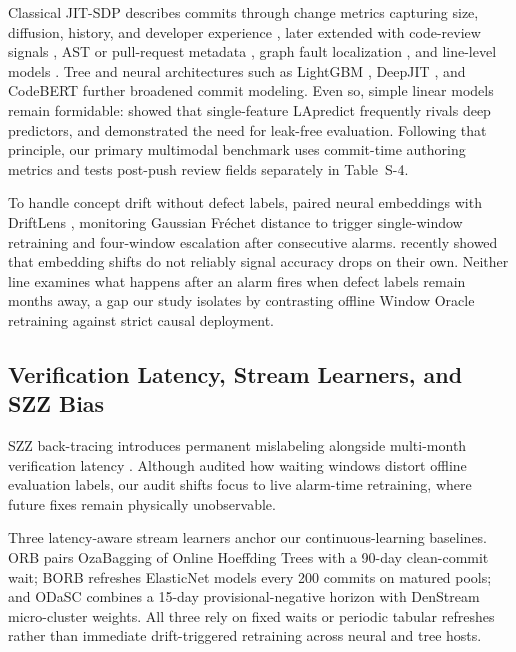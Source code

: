 \documentclass[pdflatex,sn-basic]{sn-jnl}
\theoremstyle{definition}
\theoremstyle{plain}
\begin{document}
Classical JIT-SDP describes commits through change metrics capturing size, diffusion, history, and developer experience \citep{kamei2013large}, later extended with code-review signals \citep{mcintosh2018are}, AST or pull-request metadata \citep{bludau2022feature,bludau2022prszz}, graph fault localization \citep{zheng2026hgfe}, and line-level models \citep{pornprasit2021jitline,marrium2026flame}. Tree and neural architectures such as LightGBM \citep{ke2017lightgbm}, DeepJIT \citep{hoang2019deepjit}, and CodeBERT \citep{feng2020codebert} further broadened commit modeling. Even so, simple linear models remain formidable: \citet{zeng2021deep} showed that single-feature LApredict frequently rivals deep predictors, and \citet{tantithamthavorn2017mysterious} demonstrated the need for leak-free evaluation. Following that principle, our primary multimodal benchmark uses commit-time authoring metrics and tests post-push review fields separately in Table~S-4.

To handle concept drift without defect labels, \citet{pote2026adaptive} paired neural embeddings with DriftLens \citep{greco2021driftlens,greco2023driftlens}, monitoring Gaussian Fr\'echet distance \citep{dowson1982frechet} to trigger single-window retraining and four-window escalation after consecutive alarms. \citet{shah2026detecting} recently showed that embedding shifts do not reliably signal accuracy drops on their own. Neither line examines what happens after an alarm fires when defect labels remain months away, a gap our study isolates by contrasting offline Window Oracle retraining against strict causal deployment.

\subsection{Verification Latency, Stream Learners, and SZZ Bias}
\label{sec:rel_szz}

SZZ back-tracing \citep{sliwerski2005when,dacosta2017framework} introduces permanent mislabeling \citep{rosa2021evaluating,fan2021impact,keshavarz2022apachejit,bludau2026quantifying} alongside multi-month verification latency \citep{cabral2019class,tabassam2020handling,song2023humla}. Although \citet{song2023waiting} audited how waiting windows distort offline evaluation labels, our audit shifts focus to live alarm-time retraining, where future fixes remain physically unobservable.

Three latency-aware stream learners anchor our continuous-learning baselines. ORB \citep{cabral2019class} pairs OzaBagging \citep{oza2005online} of Online Hoeffding Trees \citep{domingos2000mining} with a 90-day clean-commit wait; BORB \citep{cabral2023borb} refreshes ElasticNet models every 200 commits on matured pools; and ODaSC \citep{song2022odasc} combines a 15-day provisional-negative horizon with DenStream micro-cluster weights. All three rely on fixed waits or periodic tabular refreshes rather than immediate drift-triggered retraining across neural and tree hosts.
\end{document}
